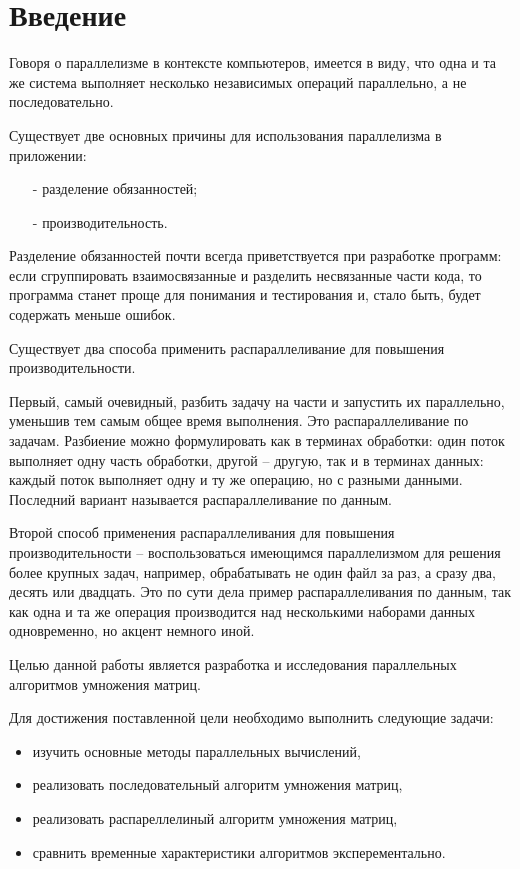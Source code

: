 \documentclass[12pt,a4paper]{report}
\begin{document}

\tableofcontents

\newpage
\chapter*{Введение}

Говоря о параллелизме в контексте компьютеров, имеется в виду,
что одна и та же система выполняет несколько независимых операций параллельно, а не последовательно.

Существует две основных причины для использования параллелизма
в приложении: 
\begin{enumerate}
    \item[-] разделение обязанностей;
    \item[-] производительность.
\end{enumerate}

Разделение обязанностей почти всегда приветствуется при разработке
программ: если сгруппировать взаимосвязанные и разделить
несвязанные части кода, то программа станет проще для понимания
и тестирования и, стало быть, будет содержать меньше ошибок.


Существует два способа применить распараллеливание для повышения производительности. 

Первый, самый очевидный, разбить
задачу на части и запустить их параллельно, уменьшив тем самым 
общее время выполнения. Это распараллеливание по задачам.  Разбиение можно формулировать как в терминах
обработки: один поток выполняет одну часть обработки, другой –
другую, так и в терминах данных: каждый поток выполняет одну и ту
же операцию, но с разными данными. Последний вариант называется
распараллеливание по данным.

Второй способ применения распараллеливания для повышения
производительности – воспользоваться имеющимся параллелизмом 
для решения более крупных задач, например, обрабатывать не один
файл за раз, а сразу два, десять или двадцать. Это по сути дела 
пример распараллеливания по данным, так как одна и та же операция 
производится над несколькими наборами данных одновременно, но
акцент немного иной. 

Целью данной работы является разработка и исследования параллельных
алгоритмов умножения матриц.

Для достижения поставленной цели необходимо выполнить следующие
задачи:

\begin{itemize}
    \item изучить основные методы параллельных вычислений,
    \item реализовать последовательный алгоритм умножения матриц,
    \item реализовать распареллелиный алгоритм умножения матриц,
    \item сравнить временные характеристики алгоритмов эксперементально.
\end{itemize}
\end{document}

